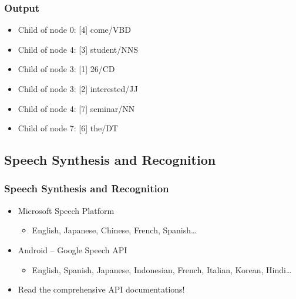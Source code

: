 \begin{frame}
\frametitle{Output}
    
\begin{itemize}
\item    Child of node 0: [4] come/VBD
\item    Child of node 4: [3] student/NNS
\item    Child of node 3: [1] 26/CD
\item    Child of node 3: [2] interested/JJ
\item    Child of node 4: [7] seminar/NN
\item    Child of node 7: [6] the/DT
\end{itemize}

\end{frame}

\subsection{Speech Synthesis and Recognition}

\begin{frame}
\frametitle{Speech Synthesis and Recognition}
    
\begin{itemize}
\item Microsoft Speech Platform
    \begin{itemize}
        \item English, Japanese, Chinese, French, Spanish\ldots
    \end{itemize}
\item Android -- Google Speech API
    \begin{itemize}
        \item English, Spanish, Japanese, Indonesian, French, Italian, Korean, Hindi\ldots
    \end{itemize}
\item Read the comprehensive API documentations!
\end{itemize}

\end{frame}


